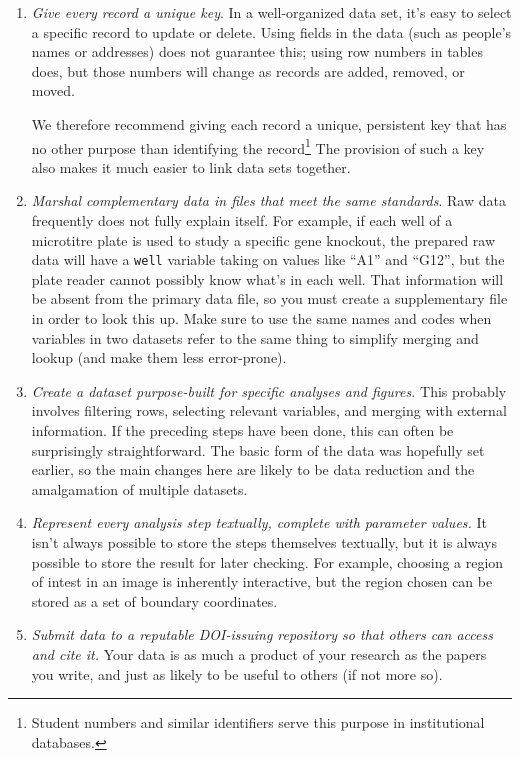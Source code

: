\documentclass[10pt]{article}
\newcommand{\recommend}[1]{\textit{#1}}
\begin{document}
\begin{enumerate}
\item
  \recommend{Give every record a unique key}.  In a
  well-organized data set, it's easy to select a specific record to
  update or delete.  Using fields in the data (such as people's names or
  addresses) does not guarantee this; using row numbers in tables does,
  but those numbers will change as records are added, removed, or moved.

  We therefore recommend giving each record a unique, persistent key
  that has no other purpose than identifying the record\footnote{Student
    numbers and similar identifiers serve this purpose in institutional
    databases.} The provision of such a key also makes it much easier to
  link data sets together.

\item
  \recommend{Marshal complementary data in files that meet the
    same standards}.  Raw data frequently does not fully explain
  itself. For example, if each well of a microtitre plate is used to
  study a specific gene knockout, the prepared raw data will have a
  \texttt{well} variable taking on values like ``A1'' and ``G12'', but
  the plate reader cannot possibly know what's in each well. That
  information will be absent from the primary data file, so you must
  create a supplementary file in order to look this up. Make sure to use
  the same names and codes when variables in two datasets refer to the
  same thing to simplify merging and lookup (and make them less
  error-prone).

\item
  \recommend{Create a dataset purpose-built for specific analyses
    and figures.}  This probably involves filtering rows, selecting
  relevant variables, and merging with external information. If the
  preceding steps have been done, this can often be surprisingly
  straightforward. The basic form of the data was hopefully set earlier,
  so the main changes here are likely to be data reduction and the
  amalgamation of multiple datasets.

\item
  \recommend{Represent every analysis step textually, complete with
    parameter values.}  It isn't always possible to store the steps
  themselves textually, but it is always possible to store the result
  for later checking.  For example, choosing a region of intest in an
  image is inherently interactive, but the region chosen can be stored
  as a set of boundary coordinates.

\item
  \recommend{Submit data to a reputable DOI-issuing
  repository so that others can access and cite it.}  Your data is as
  much a product of your research as the papers you write, and just as
  likely to be useful to others (if not more so).

\end{enumerate}
\end{document}
